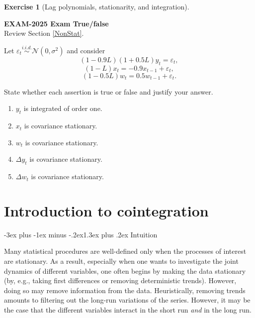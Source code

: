 \documentclass[
  11pt,
]{book}
\makeatletter
\providecommand{\tightlist}{%
  \setlength{\itemsep}{0pt}\setlength{\parskip}{0pt}}
\renewcommand\section{\@startsection{section}{1}{\z@}
  {-3ex plus -1ex minus -.2ex}{1.3ex plus .2ex}
  {\normalfont\Large\bfseries\color{TextbookInk}}}
\theoremstyle{definition}
\theoremstyle{definition}
\theoremstyle{definition}
\newtheorem{exercise}{Exercise}[chapter]
\theoremstyle{definition}
\theoremstyle{remark}
\makeatother
\begin{document}

\begin{exercisebox}

\begin{exercise}[Lag polynomials, stationarity, and integration]
\protect\hypertarget{exr:ex-exam2025-lag-polynomials-and-integration}{}\label{exr:ex-exam2025-lag-polynomials-and-integration}

\textbf{EXAM-2025 \textbar{} Exam \textbar{} True/false}\\
Review Section \ref{NonStat}.

Let \(\varepsilon_t\overset{i.i.d.}{\sim}\mathcal N(0,\sigma^2)\) and consider
\[
(1-0.9L)(1+0.5L)y_t=\varepsilon_t,
\]
\[
(1-L)x_t=-0.9x_{t-1}+\varepsilon_t,
\]
\[
(1-0.5L)w_t=0.5w_{t-1}+\varepsilon_t.
\]

State whether each assertion is true or false and justify your answer.

\begin{enumerate}
\def\labelenumi{\arabic{enumi}.}
\tightlist
\item
  \(y_t\) is integrated of order one.
\item
  \(x_t\) is covariance stationary.
\item
  \(w_t\) is covariance stationary.
\item
  \(\Delta y_t\) is covariance stationary.
\item
  \(\Delta w_t\) is covariance stationary.
\end{enumerate}

\end{exercise}

\end{exercisebox}

\chapter{Introduction to cointegration}\label{cointeg}

\section{Intuition}\label{intuition}

Many statistical procedures are well-defined only when the processes of interest are stationary. As a result, especially when one wants to investigate the joint dynamics of different variables, one often begins by making the data stationary (by, e.g., taking first differences or removing deterministic trends). However, doing so may remove information from the data. Heuristically, removing trends amounts to filtering out the long-run variations of the series. However, it may be the case that the different variables interact in the short run \emph{and} in the long run.
\end{document}
